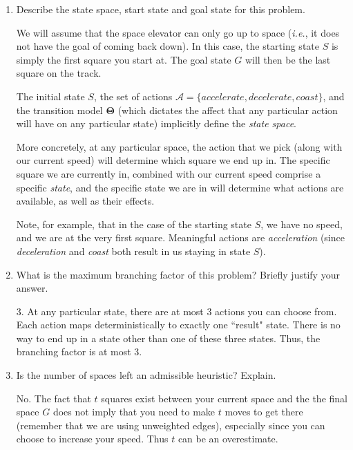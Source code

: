 \documentclass[12pt]{article}
\begin{document}
\begin{enumerate}
\item Describe the state space, start state and goal state for this problem.
\begin{solution}
We will assume that the space elevator can only go up to space (\textit{i.e.}, it does not have the goal of coming back down). In this case, the starting state $S$ is simply the first square you start at. The goal state $G$ will then be the last square on the track.
\newline

The initial state $S$, the set of actions $\mathcal{A} = \{ accelerate, decelerate, coast \}$, and the transition model $\mathbf{ \Theta }$ (which dictates the affect that any particular action will have on any particular state) implicitly define the \textit{state space}.
\newline

More concretely, at any particular space, the action that we pick (along with our current speed) will determine which square we end up in. The specific square we are currently in, combined with our current speed comprise a specific \textit{state}, and the specific state we are in will determine what actions are available, as well as their effects.
\newline

Note, for example, that in the case of the starting state $S$, we have no speed, and we are at the very first square. Meaningful actions are \textit{acceleration} (since \textit{deceleration} and \textit{coast} both result in us staying in state $S$).
\end{solution}

\item What is the maximum branching factor of this problem? Briefly justify your answer.
\begin{solution}
3. At any particular state, there are at most 3 actions you can choose from. Each action maps deterministically to exactly one ``result" state. There is no way to end up in a state other than one of these three states. Thus, the branching factor is at most 3.
\end{solution}

\item Is the number of spaces left an admissible heuristic? Explain.
\begin{solution}
No. The fact that $t$ squares exist between your current space and the the final space $G$ does not imply that you need to make $t$ moves to get there (remember that we are using unweighted edges), especially since you can choose to increase your speed. Thus $t$ can be an overestimate.
\end{solution}


\end{enumerate}
\end{document}
